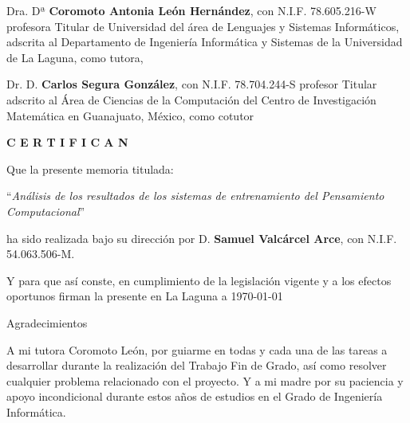 \documentclass[spanish,a4paper,14pt,oneside]{extreport}
\begin{document}
  Dra. Dª {\bf Coromoto Antonia León Hernández}, con N.I.F. 78.605.216-W
  profesora
  Titular de Universidad
  del área
  de Lenguajes y Sistemas Informáticos, adscrita al Departamento de Ingeniería Informática y Sistemas de la Universidad de La Laguna, como tutora,
   
  \bigskip
  Dr. D. {\bf Carlos Segura González}, con N.I.F. 78.704.244-S
  profesor
  Titular
  adscrito al Área
  de Ciencias de la Computación
  del Centro de Investigación Matemática en Guanajuato, México, como cotutor
   
  \bigskip
  \bigskip
  {\bf C E R T I F I C A N}
   
  \bigskip
  \bigskip
  \bigskip
  Que la presente memoria titulada:
   
  \bigskip
  ``{\it Análisis de los resultados de los sistemas de entrenamiento del Pensamiento Computacional}''
   
  \bigskip
  \bigskip
  \bigskip
   
  \noindent ha sido realizada bajo su dirección por D. {\bf Samuel Valcárcel Arce},
  con N.I.F. 54.063.506-M.
   
  \bigskip
  \bigskip
   
  Y para que así conste, en cumplimiento de la legislación vigente y a los efectos
  oportunos firman la presente en La Laguna a \today
   
  \newpage
  \thispagestyle{empty}
   
  { \flushright
   
  \begin{LARGE}
  Agradecimientos
  \end{LARGE}
   
  \hspace{3mm}
   
  \begin{large}
   
   
  \hspace{3mm}
    A mi tutora Coromoto León, por guiarme en todas y cada una de las tareas a
    desarrollar durante la realización del Trabajo Fin de Grado, así como resolver cualquier problema relacionado con el proyecto. 
    Y a mi madre por su paciencia y apoyo incondicional durante estos años de estudios en el Grado
    de Ingeniería Informática.
   
   
  \end{large}
   
  }
   
\end{document}
